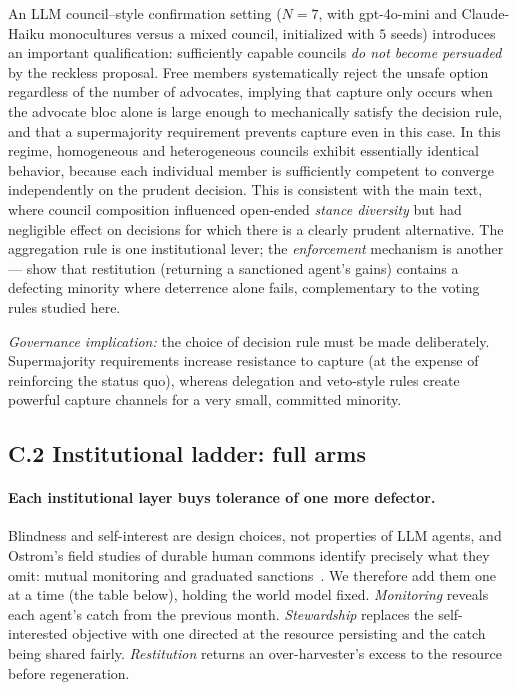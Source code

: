 \documentclass[11pt,a4paper]{article}
\begin{document}
An LLM council–style confirmation setting ($N{=}7$, with gpt-4o-mini and Claude-Haiku monocultures versus a mixed council, initialized with $5$ seeds) introduces an important qualification: sufficiently capable councils \emph{do not become persuaded} by the reckless proposal. Free members systematically reject the unsafe option regardless of the number of advocates, implying that capture only occurs when the advocate bloc alone is large enough to mechanically satisfy the decision rule, and that a supermajority requirement prevents capture even in this case. In this regime, homogeneous and heterogeneous councils exhibit essentially identical behavior, because each individual member is sufficiently competent to converge independently on the prudent decision. This is consistent with the main text, where council composition influenced open-ended \emph{stance diversity} but had negligible effect on decisions for which there is a clearly prudent alternative. The aggregation rule is one institutional lever; the \emph{enforcement} mechanism is another---\citet{bell2026restitution} show that restitution (returning a sanctioned agent's gains) contains a defecting minority where deterrence alone fails, complementary to the voting rules studied here.

\emph{Governance implication:} the choice of decision rule must be made deliberately. Supermajority requirements increase resistance to capture (at the expense of reinforcing the status quo), whereas delegation and veto-style rules create powerful capture channels for a very small, committed minority.

\subsection*{C.2 Institutional ladder: full arms}
\paragraph{Each institutional layer buys tolerance of one more defector.}
Blindness and self-interest are design choices, not properties of LLM agents, and
Ostrom's field studies of durable human commons identify precisely what they omit:
mutual monitoring and graduated sanctions~\cite{ostrom1990}. We therefore add
them one at a time (the table below), holding the world model fixed.
\emph{Monitoring} reveals each agent's catch from the previous month.
\emph{Stewardship} replaces the self-interested objective with one directed at the
resource persisting and the catch being shared fairly. \emph{Restitution} returns
an over-harvester's excess to the resource before regeneration.
\end{document}
